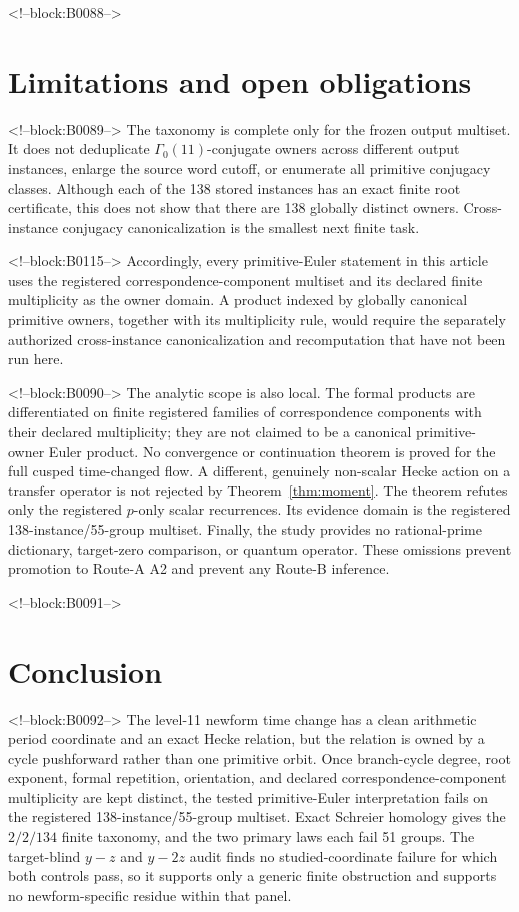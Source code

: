 \documentclass[11pt]{article}
\theoremstyle{definition}
\theoremstyle{remark}
\newcommand{\G}{\Gamma_0(11)}
\begin{document}
<!--block:B0088-->
\section{Limitations and open obligations}

<!--block:B0089-->
The taxonomy is complete only for the frozen output multiset. It does not deduplicate $\G$-conjugate owners across different output instances, enlarge the source word cutoff, or enumerate all primitive conjugacy classes. Although each of the 138 stored instances has an exact finite root certificate, this does not show that there are 138 globally distinct owners. Cross-instance conjugacy canonicalization is the smallest next finite task.

<!--block:B0115-->
Accordingly, every primitive-Euler statement in this article uses the registered correspondence-component multiset and its declared finite multiplicity as the owner domain. A product indexed by globally canonical primitive owners, together with its multiplicity rule, would require the separately authorized cross-instance canonicalization and recomputation that have not been run here.

<!--block:B0090-->
The analytic scope is also local. The formal products are differentiated on finite registered families of correspondence components with their declared multiplicity; they are not claimed to be a canonical primitive-owner Euler product. No convergence or continuation theorem is proved for the full cusped time-changed flow. A different, genuinely non-scalar Hecke action on a transfer operator is not rejected by Theorem~\ref{thm:moment}. The theorem refutes only the registered $p$-only scalar recurrences. Its evidence domain is the registered 138-instance/55-group multiset. Finally, the study provides no rational-prime dictionary, target-zero comparison, or quantum operator. These omissions prevent promotion to Route-A A2 and prevent any Route-B inference.

<!--block:B0091-->
\section{Conclusion}

<!--block:B0092-->
The level-11 newform time change has a clean arithmetic period coordinate and an exact Hecke relation, but the relation is owned by a cycle pushforward rather than one primitive orbit. Once branch-cycle degree, root exponent, formal repetition, orientation, and declared correspondence-component multiplicity are kept distinct, the tested primitive-Euler interpretation fails on the registered 138-instance/55-group multiset. Exact Schreier homology gives the $2/2/134$ finite taxonomy, and the two primary laws each fail 51 groups. The target-blind $y-z$ and $y-2z$ audit finds no studied-coordinate failure for which both controls pass, so it supports only a generic finite obstruction and supports no newform-specific residue within that panel.
\end{document}
